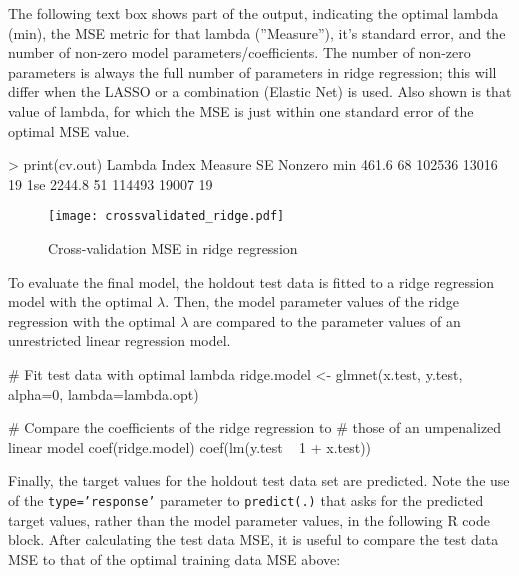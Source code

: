 \begin{samepage}
\end{samepage}

The following text box shows part of the output, indicating the optimal lambda (min), the MSE metric for that lambda (''Measure''), it's standard error, and the number of non-zero model parameters/coefficients. The number of non-zero parameters is always the full number of parameters in ridge regression; this will differ when the LASSO or a combination (Elastic Net) is used. Also shown is that value of lambda, for which the MSE is just within one standard error of the optimal MSE value. 

\begin{textcode}
> print(cv.out)
    Lambda Index Measure    SE Nonzero
min  461.6    68  102536 13016      19
1se 2244.8    51  114493 19007      19
\end{textcode}


\begin{figure}
\centering

\texttt{[image: crossvalidated\_ridge.pdf]}
\caption{Cross-validation MSE in ridge regression}
\label{fig:glmnetcv}
\end{figure}

To evaluate the final model, the holdout test data is fitted to a ridge regression model with the optimal $\lambda$. Then, the model parameter values of the ridge regression with the optimal $\lambda$ are compared to the parameter values of an unrestricted linear regression model. 

\begin{samepage}
\begin{Rcode}
# Fit test data with optimal lambda
ridge.model <- glmnet(x.test, y.test, 
                      alpha=0, lambda=lambda.opt)

# Compare the coefficients of the ridge regression to
# those of an umpenalized linear model
coef(ridge.model)
coef(lm(y.test ~ 1 + x.test))
\end{Rcode}
\end{samepage}

Finally, the target values for the holdout test data set are predicted. Note the use of the \texttt{type='response'} parameter to \texttt{predict(.)} that asks for the predicted target values, rather than the model parameter values, in the following R code block. After calculating the test data MSE, it is useful to compare the test data MSE to that of the optimal training data MSE above:

